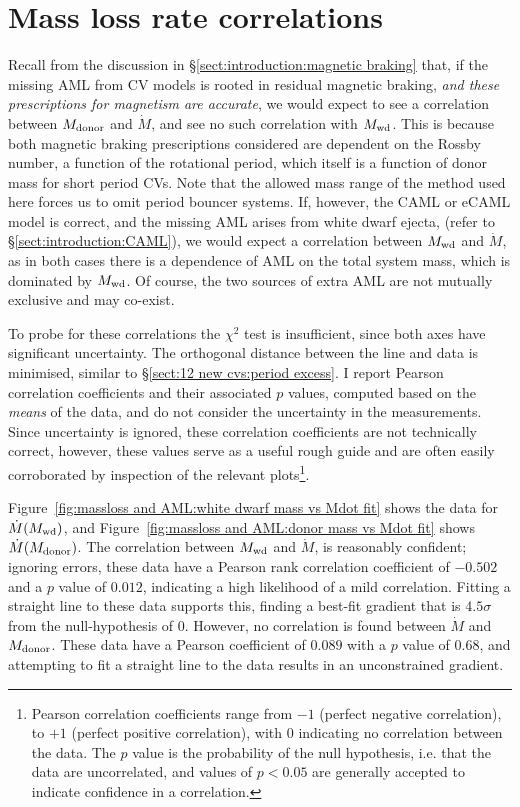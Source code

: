 \newpage
\section{Mass loss rate correlations}
\label{sect:massloss and AML:mass loss rate correlations}

Recall from the discussion in \S\ref{sect:introduction:magnetic braking} that, if the missing AML from CV models is rooted in residual magnetic braking, \textit{and these prescriptions for magnetism are accurate}, we would expect to see a correlation between $M_{\rm donor}$ and $\dot M$, and see no such correlation with $M_{\rm wd}$.
This is because both magnetic braking prescriptions considered are dependent on the Rossby number, a function of the rotational period, which itself is a function of donor mass for short period CVs. Note that the allowed mass range of the method used here forces us to omit period bouncer systems.
If, however, the CAML or eCAML model is correct, and the missing AML arises from white dwarf ejecta, (refer to \S\ref{sect:introduction:CAML}), we would expect a correlation between $M_{\rm wd}$ and $\dot M$, as in both cases there is a dependence of AML on the total system mass, which is dominated by $M_{\rm wd}$.
Of course, the two sources of extra AML are not mutually exclusive and may co-exist.

To probe for these correlations the $\chi^2$ test is insufficient, since both axes have significant uncertainty. The orthogonal distance between the line and data is minimised, similar to \S\ref{sect:12 new cvs:period excess}.
I report Pearson correlation coefficients and their associated $p$ values, computed based on the \textit{means} of the data, and do not consider the uncertainty in the measurements. Since uncertainty is ignored, these correlation coefficients are not technically correct, however, these values serve as a useful rough guide and are often easily corroborated by inspection of the relevant plots\footnote{Pearson correlation coefficients range from $-1$ (perfect negative correlation), to $+1$ (perfect positive correlation), with 0 indicating no correlation between the data. The $p$ value is the probability of the null hypothesis, i.e. that the data are uncorrelated, and values of $p < 0.05$ are generally accepted to indicate confidence in a correlation.}.

Figure~\ref{fig:massloss and AML:white dwarf mass vs Mdot fit} shows the data for $\dot M(M_{\rm wd})$, and Figure~\ref{fig:massloss and AML:donor mass vs Mdot fit} shows $\dot M(M_{\rm donor})$.
The correlation between $M_{\rm wd}$ and $\dot M$, is reasonably confident; ignoring errors, these data have a Pearson rank correlation coefficient of $-0.502$ and a $p$ value of $0.012$, indicating a high likelihood of a mild correlation. Fitting a straight line to these data supports this, finding a best-fit gradient that is $4.5\sigma$ from the null-hypothesis of 0.
However, no correlation is found between $\dot M$ and $M_{\rm donor}$. These data have a Pearson coefficient of $0.089$ with a $p$ value of $0.68$, and attempting to fit a straight line to the data results in an unconstrained gradient.

